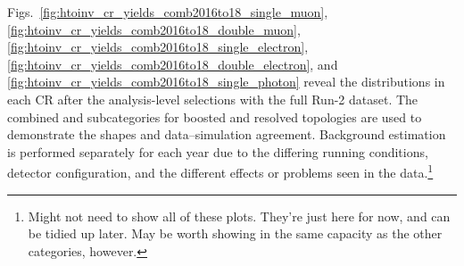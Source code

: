 Figs.~\ref{fig:htoinv_cr_yields_comb2016to18_single_muon}, \ref{fig:htoinv_cr_yields_comb2016to18_double_muon}, \ref{fig:htoinv_cr_yields_comb2016to18_single_electron}, \ref{fig:htoinv_cr_yields_comb2016to18_double_electron}, and \ref{fig:htoinv_cr_yields_comb2016to18_single_photon} reveal the \ptmiss distributions in each \gls{CR} after the analysis-level selections with the full Run-2 dataset. The combined \ttH and \VH subcategories for boosted and resolved topologies are used to demonstrate the shapes and data--simulation agreement. Background estimation is performed separately for each year due to the differing running conditions, detector configuration, and the different effects or problems seen in the data.\footnote{Might not need to show all of these plots. They're just here for now, and can be tidied up later. May be worth showing \ggH in the same capacity as the other categories, however.}

